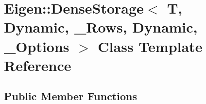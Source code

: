 \hypertarget{class_eigen_1_1_dense_storage_3_01_t_00_01_dynamic_00_01___rows_00_01_dynamic_00_01___options_01_4}{}\section{Eigen\+:\+:Dense\+Storage$<$ T, Dynamic, \+\_\+\+Rows, Dynamic, \+\_\+\+Options $>$ Class Template Reference}
\label{class_eigen_1_1_dense_storage_3_01_t_00_01_dynamic_00_01___rows_00_01_dynamic_00_01___options_01_4}
\subsection*{Public Member Functions}
